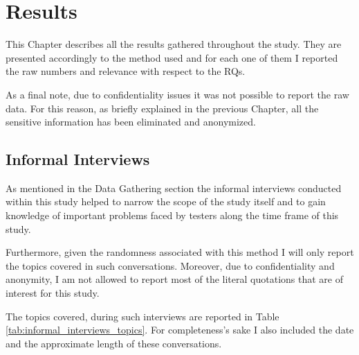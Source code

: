\chapter{Results} \label{study_results}

This Chapter describes all the results gathered throughout the study. They are presented accordingly to the method used and for each one of them I reported the raw numbers and relevance with respect to the RQs.

As a final note, due to confidentiality issues it was not possible to report the raw data. For this reason, as briefly explained in the previous Chapter, all the sensitive information has been eliminated and anonymized.



\section{Informal Interviews}
As mentioned in the Data Gathering section the informal interviews conducted within this study helped to narrow the scope of the study itself and to gain knowledge of important problems faced by testers along the time frame of this study.

Furthermore, given the randomness associated with this method I will only report the topics covered in such conversations. Moreover, due to confidentiality and anonymity, I am not allowed to report most of the literal quotations that are of interest for this study.

The topics covered, during such interviews are reported in Table \ref{tab:informal_interviews_topics}. For completeness's sake I also included the date and the approximate length of these conversations.

